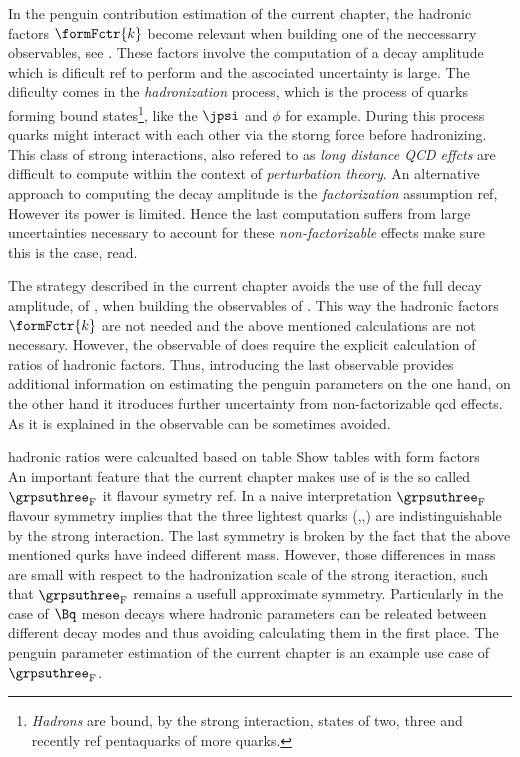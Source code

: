 In the penguin contribution estimation of the current chapter, the hadronic factors $\formFctr{k}$ become relevant when building
one of the neccessarry observables, see . These factors involve the computation of a
\BJpsiX decay amplitude which is dificult{\color{red} ref} to perform and the ascociated uncertainty is large.
The dificulty comes in the {\it hadronization} process, which is the process of quarks forming bound
states\footnote{ {\it Hadrons} are bound, by the strong interaction, states of two, three and recently{\color{red} ref pentaquarks} of more quarks.},
like the $\jpsi$ and $\phi$ for example. During this process quarks might interact with each other via
the storng force before hadronizing. This class of strong interactions, also refered to as {\it long distance QCD effcts}
are difficult to compute within the context of {\it perturbation theory}. An alternative approach
to computing the \BJpsiX decay amplitude is the {\it factorization} assumption{\color{red} ref},
However its power is limited. Hence the last computation suffers from large uncertainties necessary
to account for these {\it non-factorizable} effects{\color{red} make sure this is the case, read}.

The strategy described in the current chapter avoids the use of the full decay amplitude, of ,
when building the observables of . This way the hadronic factors $\formFctr{k}$
are not needed and the above mentioned calculations are not necessary. However, the observable of 
does require the explicit calculation of ratios of hadronic factors. Thus, introducing the last observable
provides additional information on estimating the penguin parameters on the one hand, on the other hand
it itroduces further uncertainty from non-factorizable qcd effects. As it is explained in 
the observable  can be sometimes avoided.

{\color{red} hadronic ratios were calcualted based on table  }
Show tables with form factors \\


An important feature that the current chapter makes use of is the so called $\grpsuthree_{\rm F}$ {it flavour symetry} {\color{red} ref}.
In a naive interpretation $\grpsuthree_{\rm F}$ flavour symmetry implies that the three lightest quarks (\uquark,\dquark,\squark)
are indistinguishable by the strong interaction. The last symmetry is broken by the fact that the above
mentioned qurks have indeed different mass. However, those differences in mass are small with respect
to the hadronization scale \lqcd of the strong iteraction, such that $\grpsuthree_{\rm F}$
remains a usefull approximate symmetry. Particularly in the case of $\Bq$ meson decays where hadronic
parameters can be releated between different decay modes and thus avoiding calculating them in the first place.
The penguin parameter estimation of the current chapter is an example use case of $\grpsuthree_{\rm F}$.


